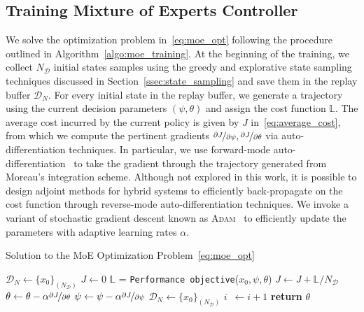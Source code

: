 \subsection{Training Mixture of Experts Controller}
\label{ssec:training_moe}

%
We solve the optimization problem in~\eqref{eq:moe_opt} following the procedure
outlined in Algorithm~\eqref{algo:moe_training}.
%
At the beginning of the training, we collect $N_{\mathcal{D}}$ initial states
samples using the greedy and explorative state sampling techniques discussed in
Section~\ref{ssec:state_sampling} and save them in the replay buffer $\mathcal{D}_N$.
%
For every initial state in the replay buffer, we generate a trajectory using the
current decision parameters $(\psi, \theta)$ and assign the cost function
$\mathbb{L}$.
%
The average cost incurred by the current policy is given by $J$
in~\eqref{eq:average_cost}, from which we compute the pertinent gradients
$\nicefrac{\partial J}{\partial \psi}, \nicefrac{\partial J}{\partial \theta}$
via auto-differentiation techniques.
%
In particular, we use forward-mode auto-differentiation~\cite{revels2016forward}
to take the gradient through the trajectory generated from Moreau's integration
scheme.
%
Although not explored in this work, it is possible to design adjoint methods for
hybrid systems to efficiently back-propagate on the cost function through
reverse-mode auto-differentiation techniques.
%
We invoke a variant of stochastic gradient descent known as
\textsc{Adam}~\cite{kingma2014adam} to efficiently update the parameters with
adaptive learning rates $\alpha$.
%
\begin{algorithm}[tb]
      \caption{Solution to the MoE Optimization Problem~\eqref{eq:moe_opt}}
      \label{algo:moe_training}
      \small
      \begin{algorithmic}[1]
          \algrenewcommand\algorithmicindent{0em} %
          \State $\mathcal{D}_N \gets \{x_0\}_{(N_{\mathcal{D}})}$   
          \algrenewcommand\algorithmicindent{1.1em} %
          \State $J \gets 0$
              \State $\mathbb{L}$ = \texttt{Performance objective}($x_0, \psi, \theta$) 
              \State $J \gets J + \mathbb{L}/N_{\mathcal{D}}$ 
          \EndFor
          \State $\theta \gets \theta - \alpha \nicefrac{\partial J}{\partial \theta}$
          \State $\psi \gets \psi - \alpha \nicefrac{\partial J}{\partial \psi}$
          \State $\mathcal{D}_N \gets \{x_0\}_{(N_{\mathcal{D}})}$
          \State $i \;\:\gets i + 1$
          \EndWhile
          \State \textbf{return} $\theta$
      \end{algorithmic}
\end{algorithm}
%

